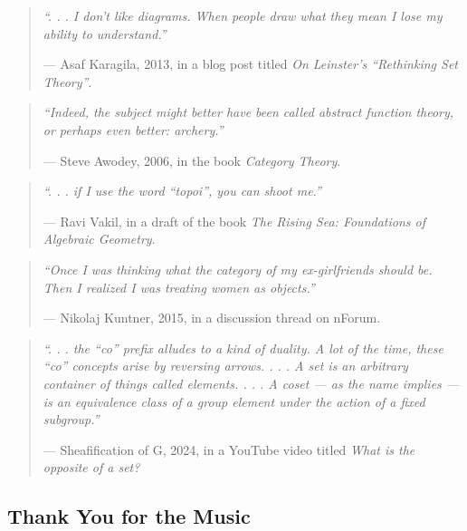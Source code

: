 \documentclass[a4paper,11pt]{article}
\theoremstyle{break_italics}
\theoremstyle{break_upright}
\theoremstyle{remark}
\begin{document}
\begin{quote}
\textit{``. . . I don't like diagrams. When people draw what they mean I lose my ability to understand.''} 

--- Asaf Karagila, 2013, in a blog post titled \textit{On Leinster's ``Rethinking Set Theory''}.
\end{quote}

\begin{quote}
\textit{``Indeed, the subject might better have been called abstract function theory, or perhaps even better: archery.''}	

--- Steve Awodey, 2006, in the book \textit{Category Theory}.
\end{quote}


\begin{quote}
\textit{``. . . if I use the word ``topoi'', you can shoot me.''} 

--- Ravi Vakil, in a draft of the book \textit{The Rising Sea: Foundations of Algebraic Geometry}.
\end{quote}

\begin{quote}
\textit{``Once I was thinking what the category of my ex-girlfriends should be. Then I realized I was treating women as objects.''}	 

--- Nikolaj Kuntner, 2015, in a discussion thread on nForum.
\end{quote}

\begin{quote}
\textit{``. . . the ``co'' prefix alludes to a kind of duality. A lot of the time, these ``co'' concepts arise by reversing arrows. . . . A set is an arbitrary container of things called elements. . . . A coset --- as the name implies --- is an equivalence class of a group element under the action of a fixed subgroup.''} 

--- Sheafification of G, 2024, in a YouTube video titled \textit{What is the opposite of a set?}	
\end{quote}



\subsection{Thank You for the Music}
\end{document}
